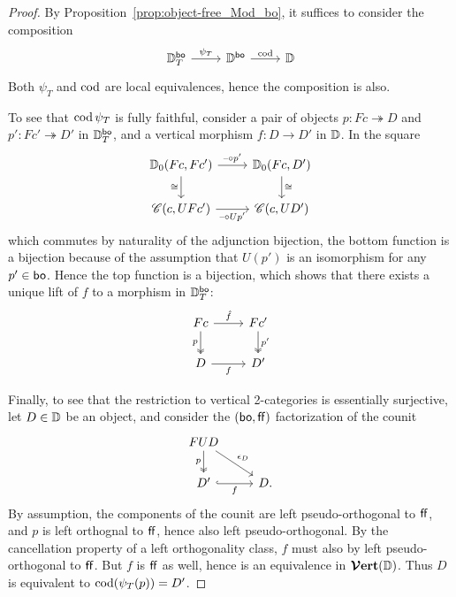 \documentclass[12pt,oneside,article,draft]{memoir}
\begin{document}
\begin{proof}
   By Proposition~\ref{prop:object-free_Mod_bo}, it suffices to consider the composition
   \begin{equation*}
      \begin{tikzcd}
         \dcat{D}^{\bo}_T \ar[r,"\psi_T"] & \dcat{D}^{\bo} \ar[r,"\cod"] & \dcat{D}
      \end{tikzcd}
   \end{equation*}
   Both $\psi_T$ and $\operatorname{cod}$ are local equivalences, hence the composition is also.

   To see that $\operatorname{cod}\psi_T$ is fully faithful, consider a pair of objects $p\colon
   Fc\twoheadrightarrow D$ and $p'\colon Fc'\twoheadrightarrow D'$ in $\mathbb{D}_T^{\mathsf{bo}}$, and a
   vertical morphism $f\colon D\to D'$ in $\mathbb{D}$. In the square
   \begin{equation*}
      \begin{tikzcd}
         \dcat{D}_0(Fc,Fc') \ar[r,"\textrm{--}\circ p'"] \ar[d,"\iso"']
            & \dcat{D}_0(Fc,D') \ar[d,"\iso"] \\
         \cat{C}(c,UFc') \ar[r,"\textrm{--}\circ Up'"']
            & \cat{C}(c,UD')
      \end{tikzcd}
   \end{equation*}
   which commutes by naturality of the adjunction bijection, the bottom function is a bijection
   because of the assumption that $U(p')$ is an isomorphism for any $p'\in\mathsf{bo}$. Hence the top
   function is a bijection, which shows that there exists a unique lift of $f$ to a morphism in
   $\mathbb{D}_T^{\mathsf{bo}}$:
   \begin{equation*}
      \begin{tikzcd}
         Fc \ar[r,"\hat{f}"] \ar[d,two heads,"p"']
            & Fc' \ar[d,two heads,"p'"] \\
         D \ar[r,"f"'] & D'
      \end{tikzcd}
   \end{equation*}

   Finally, to see that the restriction to vertical 2-categories is essentially surjective, let
   $D\in\mathbb{D}$ be an object, and consider the $(\mathsf{bo},\mathsf{ff})$ factorization of the counit
   \begin{equation*}
      \begin{tikzcd}
         FUD \ar[dr,"\epsilon_D"] \ar[d,two heads,"p"'] & \\
         D' \ar[r,hook,"f"'] & D.
      \end{tikzcd}
   \end{equation*}
   By assumption, the components of the counit are left pseudo-orthogonal to $\mathsf{ff}$, and $p$ is left
   orthognal to $\mathsf{ff}$, hence also left pseudo-orthogonal. By the cancellation property of a left
   orthogonality class, $f$ must also by left pseudo-orthogonal to $\mathsf{ff}$. But $f$ is $\mathsf{ff}$ as well,
   hence is an equivalence in $\bm{\mathcal{V}}\mathbf{ert}(\mathbb{D})$. Thus $D$ is equivalent to $\operatorname{cod}(\psi_T(p))=D'$.
\end{proof}
\end{document}
